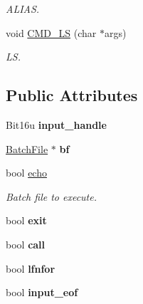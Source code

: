 \begin{DoxyCompactItemize}
\begin{DoxyCompactList}\small\item\em A\-L\-I\-A\-S. \end{DoxyCompactList}\item 
\hypertarget{classDOS__Shell_a42e5e3db09f10181a291f613479d213b}{void \hyperlink{classDOS__Shell_a42e5e3db09f10181a291f613479d213b}{C\-M\-D\-\_\-\-L\-S} (char $\ast$args)}\label{classDOS__Shell_a42e5e3db09f10181a291f613479d213b}

\begin{DoxyCompactList}\small\item\em L\-S. \end{DoxyCompactList}\end{DoxyCompactItemize}
\subsection*{Public Attributes}
\begin{DoxyCompactItemize}
\item 
\hypertarget{classDOS__Shell_ae7e99ec60f0525ac0b2824e2ae020fa2}{Bit16u {\bfseries input\-\_\-handle}}\label{classDOS__Shell_ae7e99ec60f0525ac0b2824e2ae020fa2}

\item 
\hypertarget{classDOS__Shell_a812e2fbcc49d3523e5939235c1784a8f}{\hyperlink{classBatchFile}{Batch\-File} $\ast$ {\bfseries bf}}\label{classDOS__Shell_a812e2fbcc49d3523e5939235c1784a8f}

\item 
\hypertarget{classDOS__Shell_ab4ee052352ed1dedccf0854bcacadac2}{bool \hyperlink{classDOS__Shell_ab4ee052352ed1dedccf0854bcacadac2}{echo}}\label{classDOS__Shell_ab4ee052352ed1dedccf0854bcacadac2}

\begin{DoxyCompactList}\small\item\em Batch file to execute. \end{DoxyCompactList}\item 
\hypertarget{classDOS__Shell_ad687b7ce53d445c65c56891acd4aa660}{bool {\bfseries exit}}\label{classDOS__Shell_ad687b7ce53d445c65c56891acd4aa660}

\item 
\hypertarget{classDOS__Shell_a97d3128aca26624607d9e3acd183cfae}{bool {\bfseries call}}\label{classDOS__Shell_a97d3128aca26624607d9e3acd183cfae}

\item 
\hypertarget{classDOS__Shell_a904866b60579d9209f227a1358dddb71}{bool {\bfseries lfnfor}}\label{classDOS__Shell_a904866b60579d9209f227a1358dddb71}

\item 
\hypertarget{classDOS__Shell_afe355c7cf53320fef3c696ee73d4de47}{bool {\bfseries input\-\_\-eof}}\label{classDOS__Shell_afe355c7cf53320fef3c696ee73d4de47}

\end{DoxyCompactItemize}
